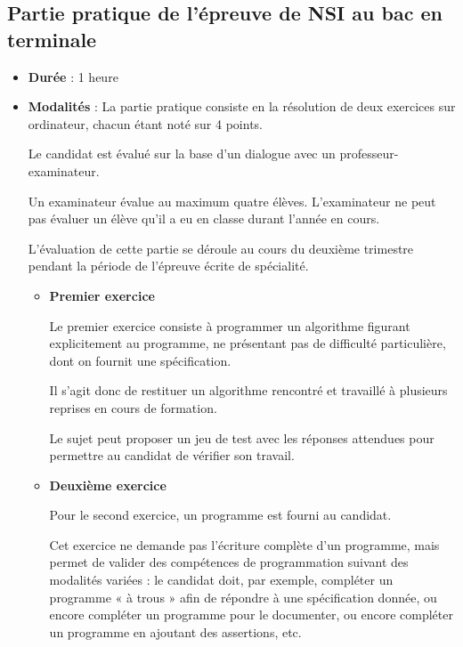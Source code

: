 \documentclass[
  letterpaper,
  DIV=11,
  numbers=noendperiod]{scrartcl}
\begin{document}
\hypertarget{partie-pratique-de-luxe9preuve-de-nsi-au-bac-en-terminale}{%
\subsection{Partie pratique de l'épreuve de NSI au bac en
terminale}\label{partie-pratique-de-luxe9preuve-de-nsi-au-bac-en-terminale}}

\begin{itemize}
\item
  \textbf{Durée} : 1 heure
\item
  \textbf{Modalités} : La partie pratique consiste en la résolution de
  deux exercices sur ordinateur, chacun étant noté sur 4 points.

  Le candidat est évalué sur la base d'un dialogue avec un
  professeur-examinateur.

  Un examinateur évalue au maximum quatre élèves. L'examinateur ne peut
  pas évaluer un élève qu'il a eu en classe durant l'année en cours.

  L'évaluation de cette partie se déroule au cours du deuxième trimestre
  pendant la période de l'épreuve écrite de spécialité.

  \begin{itemize}
  \item
    \textbf{Premier exercice}

    Le premier exercice consiste à programmer un algorithme figurant
    explicitement au programme, ne présentant pas de difficulté
    particulière, dont on fournit une spécification.

    Il s'agit donc de restituer un algorithme rencontré et travaillé à
    plusieurs reprises en cours de formation.

    Le sujet peut proposer un jeu de test avec les réponses attendues
    pour permettre au candidat de vérifier son travail.
  \item
    \textbf{Deuxième exercice}

    Pour le second exercice, un programme est fourni au candidat.

    Cet exercice ne demande pas l'écriture complète d'un programme, mais
    permet de valider des compétences de programmation suivant des
    modalités variées : le candidat doit, par exemple, compléter un
    programme « à trous » afin de répondre à une spécification donnée,
    ou encore compléter un programme pour le documenter, ou encore
    compléter un programme en ajoutant des assertions, etc.
  \end{itemize}
\end{itemize}
\end{document}
